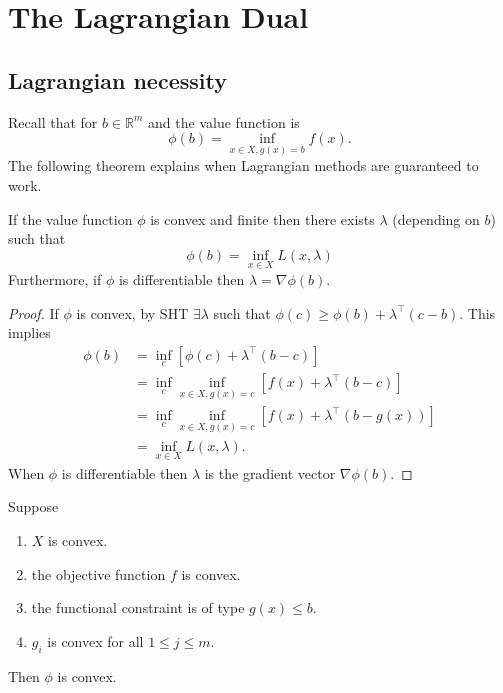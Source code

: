 \section{The Lagrangian Dual}
\subsection{Lagrangian necessity}
Recall that for $b \in \mathbb{R}^m$ and the value function is
\[
\phi(b)=\inf _{x \in X, g(x)=b} f(x) .
\]
The following theorem explains when Lagrangian methods are guaranteed to work. 
\begin{theorem}
    If the value function $\phi$ is convex and finite then there exists $\lambda$ (depending on $b$) such that
    \[
    \phi(b)=\inf _{x \in X} L(x, \lambda)
    \]
    Furthermore, if $\phi$ is differentiable then $\lambda=\nabla \phi(b)$.
\end{theorem}

\begin{proof}
    If $\phi$ is convex, by SHT $ \exists \lambda $ such that $ \phi(c) \ge \phi(b) + \lambda^\top(c-b) $. This implies 
    \begin{align*}
        \phi(b) &= \inf _c [\phi(c) + \lambda^\top(b-c)]\\ 
        &= \inf _c \inf_{x\in X, g(x)=c} [f(x)+ \lambda^\top (b-c)]\\ 
        &= \inf_{c}\inf_{x\in X, g(x)=c} [f(x) + \lambda^\top(b-g(x))]\\ 
        &= \inf _{x\in X} L(x,\lambda).
    \end{align*}
    When $\phi$ is differentiable then $\lambda$ is the gradient vector $\nabla \phi(b)$.
\end{proof}

\begin{theorem}
    Suppose
    \begin{enumerate}
        \item $X$ is convex.
        \item the objective function $f$ is convex.
        \item the functional constraint is of type $g(x) \leq b$.
        \item $g_i$ is convex for all $1 \leq j \leq m$.
    \end{enumerate}
    Then $\phi$ is convex.
\end{theorem}

